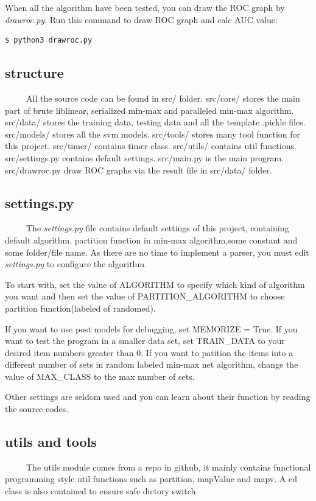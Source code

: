 \documentclass[11pt]{article}
\begin{document}
When all the algorithm have been tested, you can draw the ROC graph by \emph{drawroc.py}.
Run this command to draw ROC graph and calc AUC value:
\begin{verbatim}
$ python3 drawroc.py
\end{verbatim}

\subsection{structure}
\label{sec-4-2}
\ \ \ \ \ All the source code can be found in src/ folder. src/core/ stores the main part of
brute liblinear, serialized min-max and paralleled min-max algorithm. src/data/ stores
the training data, testing data and all the template .pickle files. src/models/ stores
all the svm models. src/tools/ stores many tool function for this project. src/timer/
contains timer class. src/utils/ contains util functions. src/settings.py contains
default settings. src/main.py is the main program. src/drawroc.py draw ROC graphs
via the result file in src/data/ folder.

\subsection{settings.py}
\label{sec-4-3}
\ \ \ \ \ The \emph{settings.py} file contains default settings of this project, containing default
algorithm, partition function in min-max algorithm,some constant and some folder/file name.
As there are no time to implement a parser, you must edit \emph{settings.py} to configure
the algorithm.

To start with, set the value of ALGORITHM
to specify which kind of algorithm you want and then set the value of PARTITION\_ALGORITHM to choose
partition function(labeled of randomed).

If you want to use post models for debugging, set MEMORIZE = True.
If you want to test the program in a smaller data set, set TRAIN\_DATA to your desired item numbers
greater than 0.
If you want to patition the items into a different number of sets in random labeled min-max net algorithm,
change the value of MAX\_CLASS to the max number of sets.

Other settings are seldom used and you can learn about their function by reading the source codes.

\subsection{utils and tools}
\label{sec-4-4}
\ \ \ \ \ The utils module comes from a repo in github, it mainly contains functional programming style
util functions such as partition, mapValue and mapv. A cd class is also contained to
ensure safe dictory switch.
\end{document}
